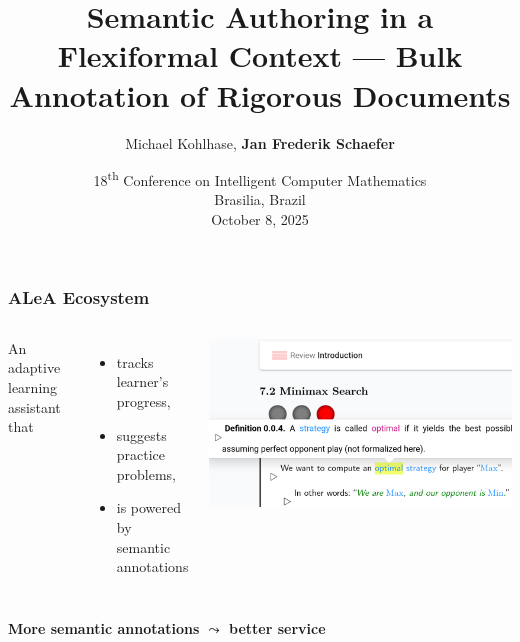 \documentclass[aspectratio=169]{beamer}
\title{Semantic Authoring in a Flexiformal Context --- Bulk Annotation of Rigorous Documents}
\author{Michael Kohlhase, \bf Jan Frederik Schaefer}
\institute{FAU Erlangen-N\"urnberg}
\date{18\textsuperscript{th} Conference on Intelligent Computer Mathematics\\Brasilia, Brazil\\October 8, 2025}
\begin{document}
\frame\titlepage


\begin{frame}
    \frametitle{ALeA Ecosystem}
    \begin{columns}
        An adaptive learning assistant that
        \begin{itemize}
            \item tracks learner's progress,
            \item suggests practice problems,
            \item is powered by semantic annotations
        \end{itemize}
        \centering\includegraphics[width=\textwidth]{alea1.png}
    \end{columns}
    \vspace{2em}\par\centering
        {\bf More semantic annotations $\bm\leadsto$ better service}
\end{frame}
\end{document}

